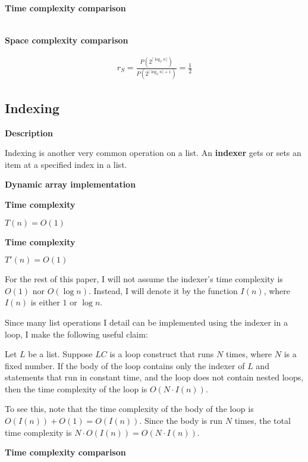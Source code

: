 \documentclass{article}
\newcommand{\descriptn}{\textbf{Description}}
\newcommand{\dynarrayimpl}{\textbf{Dynamic array implementation}}
\newcommand{\tcomplex}{\textbf{Time complexity}}
\newcommand{\tcomplexcmp}{\textbf{Time complexity comparison}}
\newcommand{\scomplexcmp}{\textbf{Space complexity comparison}}
\newcommand{\timefn}{T}
\newcommand{\spacefn}{S}
\newcommand{\timenewfn}{\timefn'}
\newcommand{\spaceratio}{r_\spacefn}
\newcommand{\bigo}{O}
\newcommand{\biggo}{P}
\newcommand{\varnitems}{n}
\newcommand{\indexertime}{I}
\newcommand{\listname}{L}
\begin{document}
	\tcomplexcmp
	
	\begin{align*}
	\end{align*}
	
	\scomplexcmp
	
	\begin{align*}
	\spaceratio = \frac {\biggo(2^{\lceil \log_2 \varnitems \rceil})} {\biggo(2^{\lceil \log_2 \varnitems \rceil + 1})} = \frac{1}{2}
	\end{align*}
	
	\subsection{Indexing}
	
	\descriptn
	
	Indexing is another very common operation on a list. An \textbf{indexer} gets or sets an item at a specified index in a list.
	
	\dynarrayimpl
	
	\tcomplex
	
	$\timefn(\varnitems) = \bigo(1)$
	
	
	\tcomplex
	
	$\timenewfn(\varnitems) = \bigo(1)$
	
	For the rest of this paper, I will not assume the indexer's time complexity is $\bigo(1)$ nor $\bigo(\log \varnitems)$. Instead, I will denote it by the function $\indexertime(\varnitems)$, where $\indexertime(\varnitems)$ is either $1$ or $\log \varnitems$.
	
	Since many list operations I detail can be implemented using the indexer in a loop, I make the following useful claim:
	
	Let $\listname$ be a list. Suppose $LC$ is a loop construct that runs $N$ times, where $N$ is a fixed number. If the body of the loop contains only the indexer of $\listname$ and statements that run in constant time, and the loop does not contain nested loops, then the time complexity of the loop is $\bigo(N \cdot \indexertime(\varnitems))$.
	
	To see this, note that the time complexity of the body of the loop is $\bigo(\indexertime(\varnitems)) + \bigo(1) = \bigo(\indexertime(\varnitems))$. Since the body is run $N$ times, the total time complexity is $N \cdot \bigo(\indexertime(\varnitems)) = \bigo(N \cdot \indexertime(\varnitems))$.
	
	\tcomplexcmp
	
\end{document}
